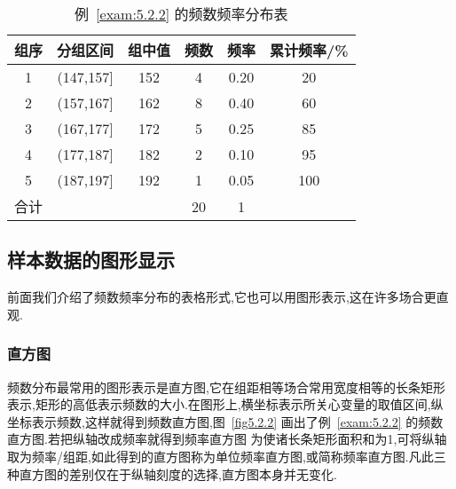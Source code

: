 \begin{table}[!htp]
  \centering
  \caption{例~\ref{exam:5.2.2} 的频数频率分布表}\label{table5.2.1}
\begin{tabularx}{0.7\textwidth}{cccccc}
\toprule
组序&分组区间&组中值&频数&频率&累计频率/\%\\
\midrule
1&(147,157]&152&4&0.20&20\\
2&(157,167]&162&8&0.40&60\\
3&(167,177]&172&5&0.25&85\\
4&(177,187]&182&2&0.10&95\\
5&(187,197]&192&1&0.05&100\\
合计&&&20&1&\\
\bottomrule
\end{tabularx}
\end{table}
\subsection{样本数据的图形显示\label{ssec:5.2.3}}
前面我们介绍了频数频率分布的表格形式,它也可以用图形表示,这在许多场合更直观.
\subsubsection{直方图}
频数分布最常用的图形表示是直方图,它在组距相等场合常用宽度相等的长条矩形表示,矩形的高低表示频数的大小.在图形上,横坐标表示所关心变量的取值区间,纵坐标表示频数,这样就得到频数直方图,图~\ref{fig5.2.2} 画出了例~\ref{exam:5.2.2} 的频数直方图.若把纵轴改成频率就得到频率直方图
为使诸长条矩形面积和为1,可将纵轴取为频率/组距,如此得到的直方图称为单位频率直方图,或简称频率直方图.凡此三种直方图的差别仅在于纵轴刻度的选择,直方图本身并无变化.
